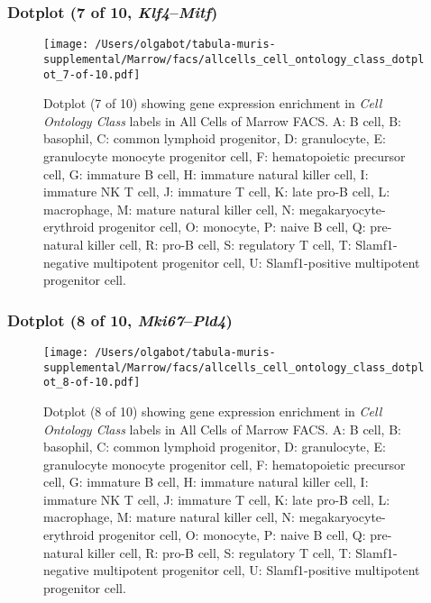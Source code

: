 \subsubsection{Dotplot (7 of 10, \emph{Klf4}--\emph{Mitf})}
\begin{figure}[h]
\centering
\texttt{[image: /Users/olgabot/tabula-muris-supplemental/Marrow/facs/allcells\_cell\_ontology\_class\_dotplot\_7-of-10.pdf]}

\caption{ Dotplot (7 of 10)  showing gene expression enrichment in \emph{Cell Ontology Class} labels in All Cells of Marrow FACS. A: B cell, B: basophil, C: common lymphoid progenitor, D: granulocyte, E: granulocyte monocyte progenitor cell, F: hematopoietic precursor cell, G: immature B cell, H: immature natural killer cell, I: immature NK T cell, J: immature T cell, K: late pro-B cell, L: macrophage, M: mature natural killer cell, N: megakaryocyte-erythroid progenitor cell, O: monocyte, P: naive B cell, Q: pre-natural killer cell, R: pro-B cell, S: regulatory T cell, T: Slamf1-negative multipotent progenitor cell, U: Slamf1-positive multipotent progenitor cell.}
\end{figure}


\clearpage

\subsubsection{Dotplot (8 of 10, \emph{Mki67}--\emph{Pld4})}
\begin{figure}[h]
\centering
\texttt{[image: /Users/olgabot/tabula-muris-supplemental/Marrow/facs/allcells\_cell\_ontology\_class\_dotplot\_8-of-10.pdf]}

\caption{ Dotplot (8 of 10)  showing gene expression enrichment in \emph{Cell Ontology Class} labels in All Cells of Marrow FACS. A: B cell, B: basophil, C: common lymphoid progenitor, D: granulocyte, E: granulocyte monocyte progenitor cell, F: hematopoietic precursor cell, G: immature B cell, H: immature natural killer cell, I: immature NK T cell, J: immature T cell, K: late pro-B cell, L: macrophage, M: mature natural killer cell, N: megakaryocyte-erythroid progenitor cell, O: monocyte, P: naive B cell, Q: pre-natural killer cell, R: pro-B cell, S: regulatory T cell, T: Slamf1-negative multipotent progenitor cell, U: Slamf1-positive multipotent progenitor cell.}
\end{figure}


\clearpage

